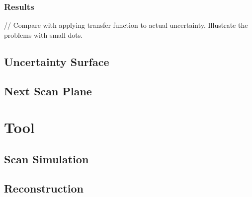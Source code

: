 \subsection*{Results}
// Compare with applying transfer function to actual uncertainty. Illustrate the problems with small dots.

\newpage
\section{Uncertainty Surface}\label{section:uncertaintysurface}

\newpage
\section{Next Scan Plane}\label{section:nextscanplane}

\newpage
\chapter{Tool}

\newpage
\section{Scan Simulation}\label{section:simulatescan}

\newpage
\section{Reconstruction}\label{section:reconstruction}
